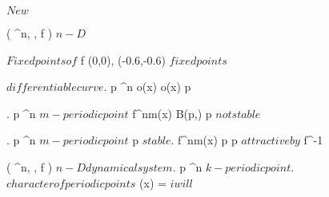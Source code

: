\documentclass[../Main/main]{subfiles}
\begin{document}
\unit{ $ New $ }
{

	{
		{
		}
		{
		}
		\denote
		{
			( \R^n, \N, f ) $ n-D$
		}
	}
	
	
	{
		{
		}
		\study
		{
			$Fixed points of $ f
		}
		\demonstration
		{
			(0,0), (-0.6,-0.6) $ fixed points $
		}
	}
	
	
	{
		{
			\gamma $ differentiable curve $.
			p \in \R^n
		}
		{
			{
				o(x) \subset \gamma*
			}
		}
		{
			{
				o(x) \convergesto p
			}
		}
	}
	
	
	{
		{
			.
			p \in \R^n $ m-periodic point $
		}
		{
			\all{ \epsilon \in \R^+ }
			{
				\ex{ \delta \in \R^+ }
				{
					{
						{
							f^{nm}(x) \in B(p,\epsilon)
						}
					}
				}
			}
		}
		{
			p $ not stable $
		}
	}
	
	
	{
		{
			.
			p \in \R^n $ m-periodic point $
		}
		{
			p $ stable $.
			\ex{ \epsilon \in \R^+ }
			{
				{
					f^{nm}(x) \convergesto p
				}
			}
		}
		{
			p $ attractive by $ f^{-1}
		}
	}
	
	
	{
		{
			( \R^n, \N, f ) $ n-D dynamical system $.
			p \in \R^n $ k-periodic point $.
			\chi $ character of periodic points $
		}	
		\holds
		{
			\ex{ \sigma \in \im( \chi ) }
			{
				{
					\chi(x) = \sigma
				}
			}
		}
		\demonstration
		{
			$ i will $
		}
	}
	
	
	
	
}
\end{document}
